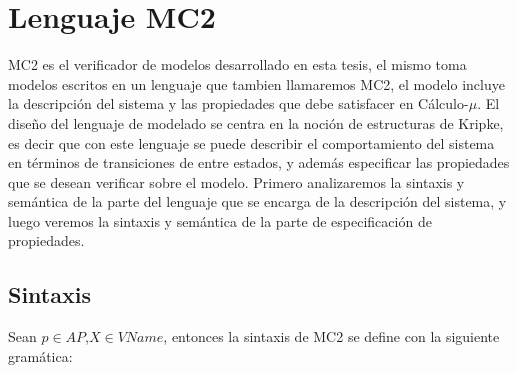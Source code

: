 \chapter{Lenguaje MC2}

MC2 es el verificador de modelos desarrollado en esta tesis, el mismo toma modelos escritos en un lenguaje que tambien llamaremos MC2, el modelo incluye la descripción del sistema y las propiedades que debe satisfacer en Cálculo-$\mu$. El diseño del lenguaje de modelado se centra en la noción de estructuras de Kripke, es decir que con este lenguaje se puede describir el comportamiento del sistema en términos de transiciones de entre estados, y además especificar las propiedades que se desean verificar sobre el modelo. Primero analizaremos la sintaxis y semántica de la parte del lenguaje que se encarga de la descripción del sistema, y luego veremos la sintaxis y semántica de la parte de especificación de propiedades.


\section{Sintaxis}
Sean $p \in AP$,$X \in VName$, entonces la sintaxis de MC2 se define con la siguiente gramática:

